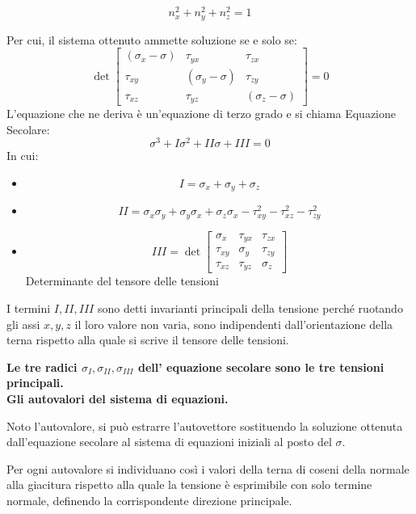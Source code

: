 \documentclass{article}
\begin{document}
\begin{adjustwidth}{2in}{}
	\[
	n_x^2 + n_y^2 + n_z^2 = 1
	\]
	
	Per cui, il sistema ottenuto ammette soluzione se e solo se:
	\[
	\det\left[\begin{array}{ccc}
		(\sigma_x - \sigma) & \tau_{yx} & \tau_{zx} \\
		\tau_{xy} & (\sigma_y - \sigma) & \tau_{zy} \\
		\tau_{xz} & \tau_{yz} & (\sigma_z - \sigma)
	\end{array} \right] = 0 
	\]
	L'equazione che ne deriva è un'equazione di terzo grado e si chiama Equazione Secolare: 
	\[ \sigma ^3 + I\sigma^2 + II\sigma + III = 0 \] \newpage
	In cui: 
	\begin{itemize}
	\item 
		\[ I = \sigma_x + \sigma_y + \sigma_z \]

	\item 
		\[ II = \sigma_x \sigma_y + \sigma_y \sigma_x + \sigma_z \sigma_x - \tau_{xy}^2 - \tau_{xz}^2  - \tau_{zy}^2\]
	
	\item 
		\[ III = \det\left[\begin{array}{ccc}
			\sigma_x & \tau_{yx} & \tau_{zx} \\
			\tau_{xy} & \sigma_y & \tau_{zy} \\
			\tau_{xz} & \tau_{yz} & \sigma_z
		\end{array} \right]
		\] 
		Determinante del tensore delle tensioni 
	\end{itemize}
	 I termini $I, II, III$ sono detti invarianti principali della tensione perché ruotando gli assi $x,y,z$ il loro valore non varia, sono indipendenti dall'orientazione della terna rispetto alla quale si scrive il tensore delle tensioni. \newline
	 
	 \begin{center}
	 	\textbf{Le tre radici $\sigma_I, \sigma_{II}, \sigma_{III}$ dell’ equazione secolare sono le tre tensioni principali. \\ Gli autovalori del sistema di equazioni.} \newline
	 \end{center} 
 
	Noto l'autovalore, si può estrarre l'autovettore sostituendo la soluzione ottenuta dall'equazione secolare al sistema di equazioni iniziali al posto del $\sigma$. 
	
	Per ogni autovalore si individuano così i valori della terna di coseni della normale alla giacitura rispetto alla quale la tensione è esprimibile con solo termine normale, definendo la corrispondente direzione principale. \newline 
	 

\end{adjustwidth}
\end{document}
